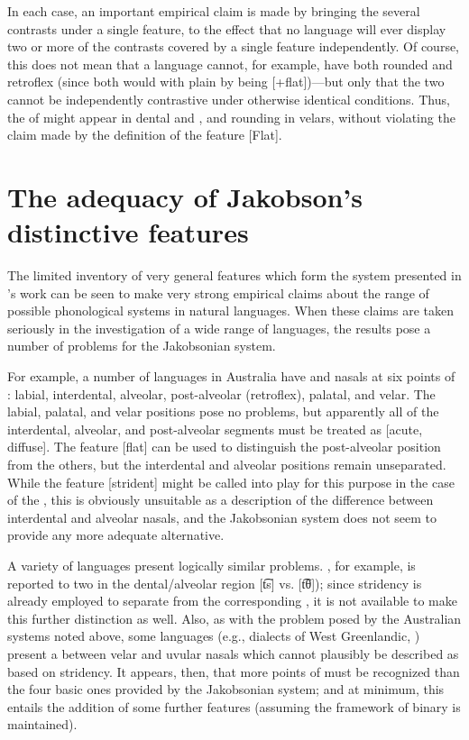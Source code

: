 In each case, an important empirical claim is made by bringing the
several contrasts under a single feature, to the effect that no
language will ever display two or more of the contrasts covered by a
single feature independently. Of course, this does not mean that a
language cannot, for example, have both rounded and retroflex
 (since both would  with plain  by being
[+flat])—but only that the two cannot be independently contrastive
under otherwise identical conditions. Thus, the  of
 might appear in dental  and , and rounding
in velars, without violating the claim made by the definition of the
feature [Flat].

\section{The adequacy of Jakobson's distinctive features}

The limited inventory of very general features which form the system
presented in {\Jakobson}'s work
\citep{jakobson.fant.halle52:preliminaries,cherry.halle.jakobson53:logical,jakobson.halle56:fundamentals}
can be seen to make very strong empirical claims about the range of
possible phonological systems in natural languages. When these claims
are taken seriously in the investigation of a wide range of languages,
the results pose a number of problems for the Jakobsonian system.

For example, a number of languages in Australia have  and nasals
at six points of  \citep{butcher.fletcher14:australian}:
labial, interdental, alveolar, post-alveolar (retroflex), palatal, and
velar. The labial, palatal, and velar positions pose no problems, but
apparently all of the interdental, alveolar, and post-alveolar segments
must be treated as [acute, diffuse]. The feature [flat] can be used to
distinguish the post-alveolar position from the others, but the
interdental and alveolar positions remain unseparated. While the
feature [strident] might be called into play for this purpose in the
case of the , this is obviously unsuitable as a description of
the difference between interdental and alveolar nasals, and the
Jakobsonian system does not seem to provide any more adequate
alternative.

A variety of languages present logically similar problems. 
\citep{cook04:chipewyan}, for example, is reported to  two
 in the dental/alveolar region [t͡s] vs. [t͡θ]); since
stridency is already employed to separate  from the
corresponding , it is not available to make this further
distinction as well. Also, as with the problem posed by the Australian
systems noted above, some languages (e.g., dialects of West
Greenlandic, \citealt{rischel74:greenlandic}) present a 
between velar and uvular nasals which cannot plausibly be described as
based on stridency. It appears, then, that more points of 
must be recognized than the four basic ones provided by the
Jakobsonian system; and at minimum, this entails the addition of some
further features (assuming the framework of binary  is
maintained).

